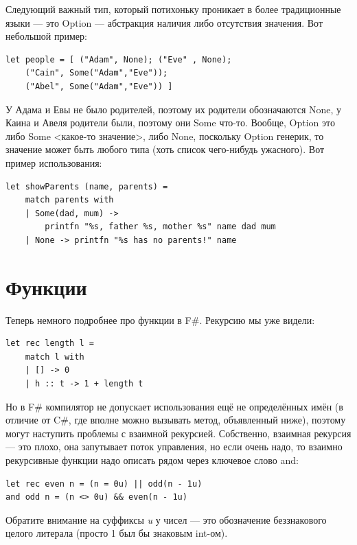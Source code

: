 \documentclass{../../text-style}
\begin{document}
Следующий важный тип, который потихоньку проникает в более традиционные языки --- это Option --- абстракция наличия либо отсутствия значения. Вот небольшой пример:

\begin{verbatim}
let people = [ ("Adam", None); ("Eve" , None);
    ("Cain", Some("Adam","Eve"));
    ("Abel", Some("Adam","Eve")) ]
\end{verbatim}

У Адама и Евы не было родителей, поэтому их родители обозначаются None, у Каина и Авеля родители были, поэтому они Some что-то. Вообще, Option это либо Some <какое-то значение>, либо None, поскольку Option генерик, то значение может быть любого типа (хоть список чего-нибудь ужасного). Вот пример использования:

\begin{verbatim}
let showParents (name, parents) =
    match parents with
    | Some(dad, mum) -> 
        printfn "%s, father %s, mother %s" name dad mum
    | None -> printfn "%s has no parents!" name
\end{verbatim}

\section{Функции}

Теперь немного подробнее про функции в F\#. Рекурсию мы уже видели:

\begin{verbatim}
let rec length l =
    match l with
    | [] -> 0
    | h :: t -> 1 + length t
\end{verbatim}

Но в F\# компилятор не допускает использования ещё не определённых имён (в отличие от C\#, где вполне можно вызывать метод, объявленный ниже), поэтому могут наступить проблемы с взаимной рекурсией. Собственно, взаимная рекурсия --- это плохо, она запутывает поток управления, но если очень надо, то взаимно рекурсивные функции надо описать рядом через ключевое слово and:

\begin{verbatim}
let rec even n = (n = 0u) || odd(n - 1u)
and odd n = (n <> 0u) && even(n - 1u)
\end{verbatim}

Обратите внимание на суффиксы \textit{u} у чисел --- это обозначение беззнакового целого литерала (просто 1 был бы знаковым int-ом).
\end{document}
